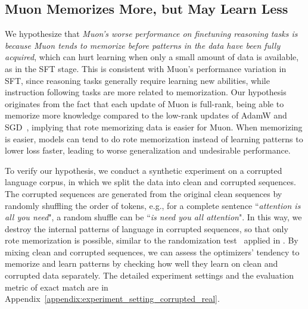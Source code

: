 \documentclass{article}
\theoremstyle{remark}
\begin{document}
\subsection{Muon Memorizes More, but May Learn Less}\label{sec:experiment_corrupted_real}
We hypothesize that \textit{Muon's worse performance on finetuning reasoning tasks is because Muon tends to memorize before patterns in the data have been fully acquired}, which can hurt learning when only a small amount of data is available, as in the SFT stage. This is consistent with Muon's performance variation in SFT, since reasoning tasks generally require learning new abilities, while instruction following tasks are more related to memorization.
Our hypothesis originates from the fact that each update of Muon is full-rank, being able to memorize more knowledge compared to the low-rank updates of AdamW and SGD~\citep{yang2023spectral}, implying that rote memorizing data is easier for Muon. When memorizing is easier, models can tend to do rote memorization instead of learning patterns to lower loss faster, leading to worse generalization and undesirable performance.

To verify our hypothesis, we conduct a synthetic experiment on a corrupted language corpus, in which we split the data into clean and corrupted sequences. The corrupted sequences are generated from the original clean sequences by randomly shuffling the order of tokens, e.g., for a complete sentence ``\textit{attention is all you need}", a random shuffle can be ``\textit{is need you all attention}". In this way, we destroy the internal patterns of language in corrupted sequences, so that only rote memorization is possible, similar to the randomization test~\citep{edgington2007randomization} applied in \citet{zhang2016understanding}. 
By mixing clean and corrupted sequences, we can assess the optimizers' tendency to memorize and learn patterns by checking how well they learn on clean and corrupted data separately.
The detailed experiment settings and the evaluation metric of exact match are in Appendix~\ref{appendix:experiment_setting_corrupted_real}.
\end{document}
